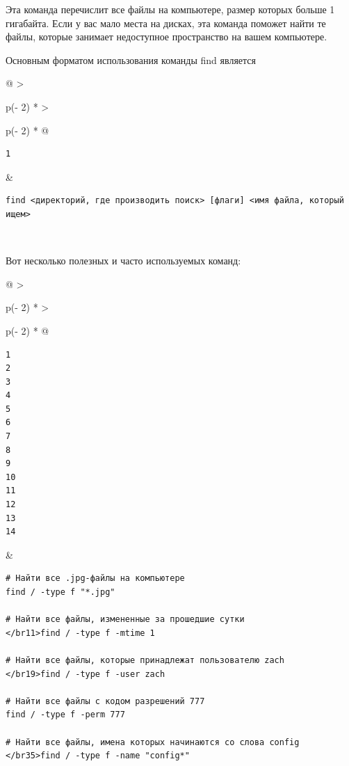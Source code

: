 \documentclass{report}
\begin{document}
Эта команда перечислит все файлы на компьютере, размер которых больше 1
гигабайта. Если у вас мало места на дисках, эта команда поможет найти те
файлы, которые занимает недоступное пространство на вашем компьютере.

Основным форматом использования команды find является

\begin{longtable}[]{@{}
  >{\raggedright\arraybackslash}p{(\columnwidth - 2\tabcolsep) * }
  >{\raggedright\arraybackslash}p{(\columnwidth - 2\tabcolsep) * }@{}}
\toprule
\endhead
\begin{minipage}[t]{\linewidth}\raggedright
\begin{verbatim}
1
\end{verbatim}
\end{minipage} & \begin{minipage}[t]{\linewidth}\raggedright
\begin{verbatim}
find <директорий, где производить поиск> [флаги] <имя файла, который ищем>
\end{verbatim}
\end{minipage} \\ \addlinespace
\bottomrule
\end{longtable}

Вот несколько полезных и часто используемых команд:

\begin{longtable}[]{@{}
  >{\raggedright\arraybackslash}p{(\columnwidth - 2\tabcolsep) * }
  >{\raggedright\arraybackslash}p{(\columnwidth - 2\tabcolsep) * }@{}}
\toprule
\endhead
\begin{minipage}[t]{\linewidth}\raggedright
\begin{verbatim}
1
2
3
4
5
6
7
8
9
10
11
12
13
14
\end{verbatim}
\end{minipage} & \begin{minipage}[t]{\linewidth}\raggedright
\begin{verbatim}
# Найти все .jpg-файлы на компьютере
find / -type f "*.jpg"

# Найти все файлы, измененные за прошедшие сутки
</br11>find / -type f -mtime 1

# Найти все файлы, которые принадлежат пользователю zach
</br19>find / -type f -user zach

# Найти все файлы с кодом разрешений 777
find / -type f -perm 777

# Найти все файлы, имена которых начинаются со слова config
</br35>find / -type f -name "config*"
\end{verbatim}
\end{minipage} \\ \addlinespace
\bottomrule
\end{longtable}
\end{document}
